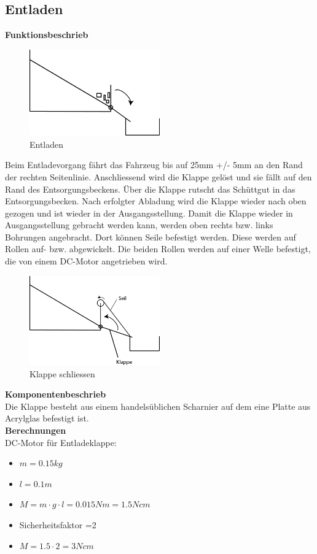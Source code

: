 \subsection{Entladen}
%
\textbf{Funktionsbeschrieb}\\[0.2cm]
\begin{figure}[H]
\centering
\includegraphics[width=0.5\textwidth]{03_Loesungskonzept/pictures/Entladen_Schraegbehaelter.png}
\caption{Entladen}
\end{figure}
%
Beim Entladevorgang fährt das Fahrzeug bis auf 25mm +/- 5mm an den Rand der rechten Seitenlinie. Anschliessend wird die Klappe gelöst und sie fällt auf den Rand des Entsorgungsbeckens. Über die Klappe rutscht das Schüttgut in das Entsorgungsbecken. Nach erfolgter Abladung wird die Klappe wieder nach oben gezogen und ist wieder in der Ausgangsstellung.
%
Damit die Klappe wieder in Ausgangsstellung gebracht werden kann, werden oben rechts bzw. links Bohrungen angebracht. Dort können Seile befestigt werden. Diese werden auf Rollen auf- bzw. abgewickelt. Die beiden Rollen werden auf einer Welle befestigt, die von einem DC-Motor angetrieben wird.\\[0.2cm]
\begin{figure}[H]
\centering
\includegraphics[width=0.5\textwidth]{03_Loesungskonzept/pictures/Klappe_schliessen.png}
\caption{Klappe schliessen}
\end{figure}
%
\textbf{Komponentenbeschrieb}\\[0.2cm]
Die Klappe besteht aus einem handelsüblichen Scharnier auf dem eine Platte aus Acrylglas befestigt ist.\\[0.2cm]
%
\textbf{Berechnungen}\\[0.2cm]
DC-Motor für Entladeklappe:
\begin{itemize}
\item $m = 0.15kg$
\item $l = 0.1m$
\item $M = m\cdot g\cdot l = 0.015Nm = 1.5Ncm$
\item Sicherheitsfaktor =2
\item $M = 1.5\cdot 2 = 3Ncm$
\end{itemize} 